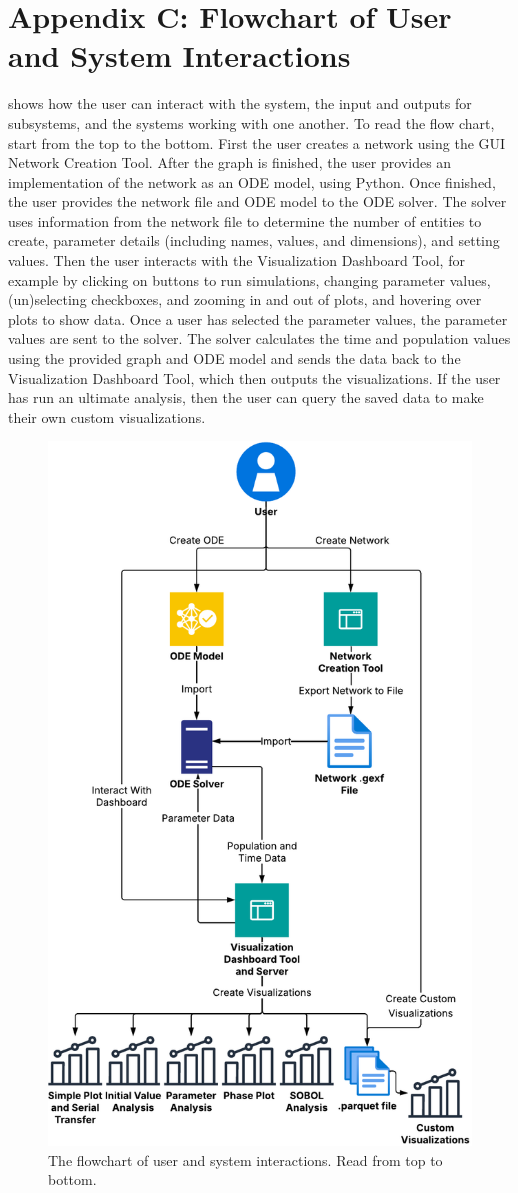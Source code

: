 \chapter{Appendix C: Flowchart of User and System Interactions}
\label{AppendixC}

 shows how the user can interact with the system, the input and outputs for subsystems, and the systems working with one another. 
    To read the flow chart, start from the top to the bottom. 
    First the user creates a network using the GUI Network Creation Tool. 
    After the graph is finished, the user provides an implementation of the network as an ODE model, using Python. 
    Once finished, the user provides the network file and ODE model to the ODE solver. 
    The solver uses information from the network file to determine the number of entities to create, parameter details (including names, values, and dimensions), and setting values.
    Then the user interacts with the Visualization Dashboard Tool, for example by clicking on buttons to run simulations, changing parameter values, (un)selecting checkboxes, and zooming in and out of plots, and hovering over plots to show data. 
    Once a user has selected the parameter values, the parameter values are sent to the solver. 
    The solver calculates the time and population values using the provided graph and ODE model and sends the data back to the Visualization Dashboard Tool, which then outputs the visualizations. 
    If the user has run an ultimate analysis, then the user can query the saved data to make their own custom visualizations.
\begin{figure}
    \centering
    \includegraphics[width=0.8\linewidth]{Images/interaction_diagram.pdf}
    \captionsetup{width=1\linewidth}
    \caption{
        The flowchart of user and system interactions. Read from top to bottom. 
    }
    \label{fig:interaction_diagram}
\end{figure} 